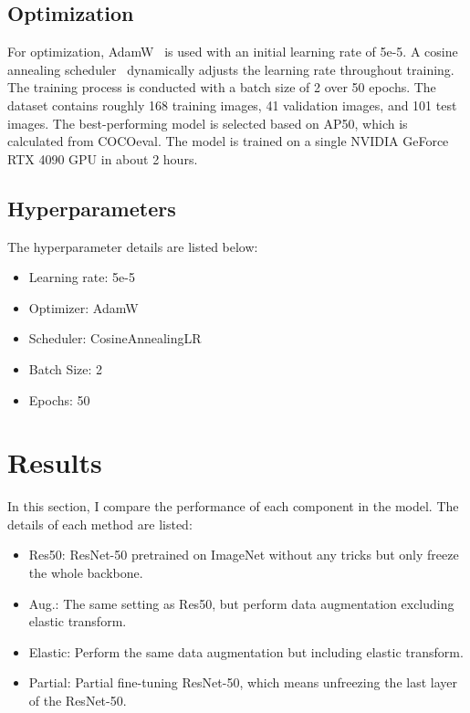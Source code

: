 \documentclass[10pt,twocolumn,letterpaper]{article}
\begin{document}
\subsection{Optimization}

For optimization, AdamW~\cite{AdamW} is used with an initial learning rate of 5e-5.
A cosine annealing scheduler~\cite{CosineAnnealing} dynamically adjusts the learning
rate throughout training. The training process is conducted with a batch size of 2
over 50 epochs. The dataset contains roughly 168 training images, 41 validation
images, and 101 test images. The best-performing model is selected based on AP50,
which is calculated from COCOeval. The model is trained on a single NVIDIA GeForce
RTX 4090 GPU in about 2 hours.

\subsection{Hyperparameters}

\noindent The hyperparameter details are listed below:
\begin{itemize}
  \setlength\itemsep{0pt}
  \item Learning rate: 5e-5
  \item Optimizer: AdamW
  \item Scheduler: CosineAnnealingLR
  \item Batch Size: 2
  \item Epochs: 50
\end{itemize}

\section{Results}

In this section, I compare the performance of each component in the model.
The details of each method are listed:
\begin{itemize}
  \setlength\itemsep{0pt}
  \item Res50: ResNet-50 pretrained on ImageNet without any tricks but only freeze
    the whole backbone.
  \item Aug.: The same setting as Res50, but perform data augmentation excluding
    elastic transform.
  \item Elastic: Perform the same data augmentation but including elastic transform.
  \item Partial: Partial fine-tuning ResNet-50, which means unfreezing the last layer
    of the ResNet-50.
\end{itemize}
\end{document}
